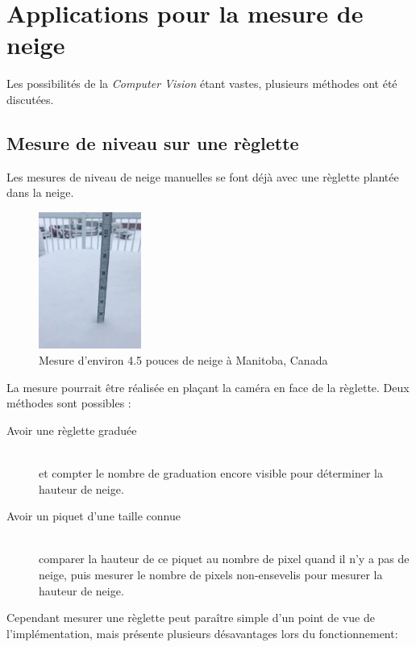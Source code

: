 \section{Applications pour la mesure de neige}
Les possibilités de la \emph{Computer Vision} étant vastes, plusieurs méthodes ont été discutées.

\subsection{Mesure de niveau sur une règlette}
Les mesures de niveau de neige manuelles se font déjà avec une règlette plantée dans la neige.

\begin{figure}[H]
    \centering
    \includegraphics[width=0.3\textwidth]{Images/computer_vision/snow_meter.PNG}
    \caption[Mesure de neige à la règle]{Mesure d'environ 4.5 pouces de neige à Manitoba, Canada\footnotemark[1]}
    \label{fig:Snow meter}
\end{figure}
\noindent
La mesure pourrait être réalisée en plaçant la caméra en face de la règlette.
Deux méthodes sont possibles :
\begin{description}
    \item[Avoir une règlette graduée] \hfill \\
    et compter le nombre de graduation encore visible pour déterminer la hauteur de neige.
    \item[Avoir un piquet d'une taille connue] \hfill \\
    comparer la hauteur de ce piquet au nombre de pixel quand il n'y a pas de neige,
    puis mesurer le nombre de pixels non-ensevelis pour mesurer la hauteur de neige.
\end{description}
\noindent
Cependant mesurer une règlette peut paraître simple d'un point de vue de l'implémentation,
mais présente plusieurs désavantages lors du fonctionnement:

